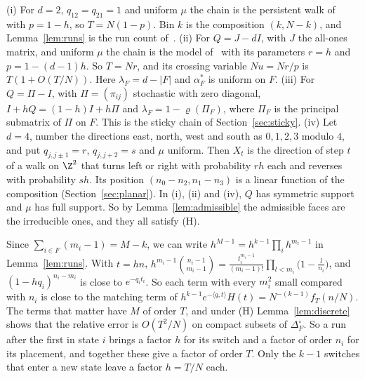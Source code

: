 \begin{example}\label{ex:models}
(i) For $d=2$, $q_{12}=q_{21}=1$ and uniform $\mu$ the chain is the persistent walk
of~\cite{paperA} with $p=1-h$, so $T=N(1-p)$. Bin $k$ is the composition $(k,N-k)$, and
Lemma~\ref{lem:runs} is the run count of~\cite[Thm.~2.1]{paperA}. (ii) For $Q=J-dI$, with $J$
the all-ones matrix, and uniform $\mu$ the chain is the model of~\cite{paperB} with its
parameters $r=h$ and $p=1-(d-1)h$. So $T=Nr$, and its crossing variable $Nu=Nr/p$ is
$T(1+O(T/N))$. Here $\lambda_F=d-\lvert F\rvert$ and $\alpha^*_F$ is uniform on $F$. (iii) For
$Q=\Pi-I$, with $\Pi=(\pi_{ij})$ stochastic with zero diagonal, $I+hQ=(1-h)I+h\Pi$ and
$\lambda_F=1-\varrho(\Pi_F)$, where $\Pi_F$ is the principal submatrix of $\Pi$ on $F$. This is
the sticky chain of Section~\ref{sec:sticky}. (iv) Let $d=4$, number the directions east, north,
west and south as $0,1,2,3$ modulo $4$, and put $q_{j,j\pm1}=r$, $q_{j,j+2}=s$ and $\mu$ uniform.
Then $X_t$ is the direction of step $t$ of a walk on $\Z^2$ that turns left or right with
probability $rh$ each and reverses with probability $sh$. Its position $(n_0-n_2,n_1-n_3)$ is a
linear function of the composition (Section~\ref{sec:planar}). In (i), (ii) and (iv), $Q$ has
symmetric support and $\mu$ has full support. So by Lemma~\ref{lem:admissible} the admissible
faces are the irreducible ones, and they all satisfy \textup{(H)}.
\end{example}

\begin{remark}\label{rem:lattice-term}
Since $\sum_{i\in F}(m_i-1)=M-k$, we can write $h^{M-1}=h^{k-1}\prod_ih^{m_i-1}$ in
Lemma~\ref{lem:runs}. With $t=hn$,
$h^{m_i-1}\binom{n_i-1}{m_i-1}=\frac{t_i^{m_i-1}}{(m_i-1)!}\prod_{l<m_i}\bigl(1-\frac l{n_i}\bigr)$,
and $(1-hq_i)^{n_i-m_i}$ is close to $e^{-q_it_i}$. So each term with every $m_i^2$ small compared
with $n_i$ is close to the matching term of
$h^{k-1}e^{-\langle q,t\rangle}H(t)=N^{-(k-1)}f_T(n/N)$. The terms that matter have $M$ of order
$T$, and under \textup{(H)} Lemma~\ref{lem:discrete} shows that the relative error is $O(T^2/N)$
on compact subsets of $\Delta_F^\circ$. So a run after the first in state $i$ brings a factor $h$
for its switch and a factor of order $n_i$ for its placement, and together these give a factor of
order $T$. Only the $k-1$ switches that enter a new state leave a factor $h=T/N$ each.
\end{remark}
